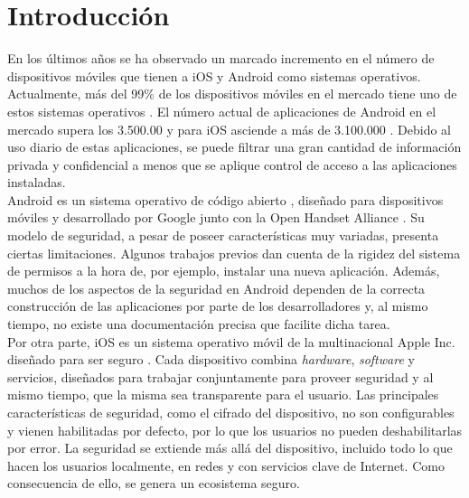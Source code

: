 \chapter{Introducción}
En los últimos años se ha observado un marcado incremento en el número de dispositivos móviles
que tienen a iOS y Android como sistemas operativos. Actualmente, más del 99\% de los dispositivos móviles en el mercado tiene uno de estos sistemas operativos \cite{wss}. El número actual de aplicaciones de Android en el mercado supera los 3.500.00 \cite{GPS} y para iOS asciende a más de 3.100.000 \cite{ASM}. Debido al uso diario de estas aplicaciones, se puede filtrar una gran cantidad de información privada y confidencial a menos que se aplique control de acceso a las aplicaciones instaladas.\\

Android \cite{aos} es un sistema operativo de código abierto \cite{aosp}, diseñado para dispositivos móviles y desarrollado por Google junto con la Open Handset Alliance \cite{oha}. Su modelo de seguridad, a pesar de poseer características muy variadas, presenta ciertas limitaciones. Algunos trabajos previos dan cuenta de la rigidez del sistema de permisos a la hora de, por ejemplo, instalar una nueva aplicación. Además, muchos de los aspectos de la seguridad en Android dependen de la correcta construcción de las aplicaciones por parte de los desarrolladores y, al mismo tiempo, no existe una documentación precisa que facilite dicha tarea.\\

Por otra parte, iOS es un sistema operativo móvil de la multinacional Apple Inc. diseñado para ser seguro \cite{asg}. Cada dispositivo combina \emph{hardware}, \emph{software} y servicios, diseñados para trabajar conjuntamente para proveer seguridad y al mismo tiempo, que la misma sea transparente para el usuario. Las principales características de seguridad, como el cifrado del dispositivo, no son configurables y vienen habilitadas por defecto, por lo que los usuarios no pueden deshabilitarlas por error. La seguridad se extiende más allá del dispositivo, incluido todo lo que hacen los usuarios localmente, en redes y con servicios clave de Internet. Como consecuencia de ello, se genera un ecosistema seguro.\\

